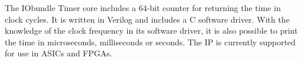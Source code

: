The IObundle Timer core includes a 64-bit counter for returning the time in
clock cycles. It is written in Verilog and includes a C software driver. With
the knowledge of the clock frequency in its software driver, it is also possible
to print the time in microseconds, milliseconds or seconds.  The IP is currently
supported for use in ASICs and FPGAs.

